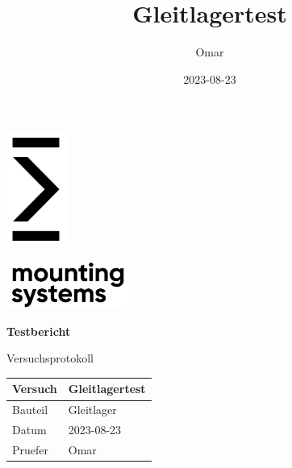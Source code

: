 \documentclass{article}%
\title{Gleitlagertest}%
\author{Omar}%
\date{2023{-}08{-}23}%
\begin{document}
%
\normalsize%
\pagestyle{header}%

\begin{titlepage}
    \begin{minipage}[t][4cm][l]{0.4\textwidth}
        \includegraphics[width=75px]{MSG-Signet-Schwarz-CMYK-170414-02.png}
    \end{minipage}
    \hspace{2cm}
    \begin{minipage}[t][4cm][t]{0.4\textwidth}
        \includegraphics[width=150px]{MSG-Signet-Schwarz-CMYK-170414-01.png}
    \end{minipage}
    \begin{center}
    \begin{Huge}
        \textbf{Testbericht}\\
          
        
        \end{Huge}
        
    \vspace{3cm}
    \large{Versuchsprotokoll} \\
    \vspace{2cm}
    \large
    \begin{tabular}{| p{} | p{}|}
        \hline
            Versuch & Gleitlagertest\\  \hline
             Bauteil  & Gleitlager  \\ \hline
             Datum & 2023-08-23\\ \hline
             Pruefer & Omar\\ \hline
             
    \end{tabular}
\end{center}
\end{titlepage}
%
\newpage%
\tableofcontents%
\newpage%
\end{document}
